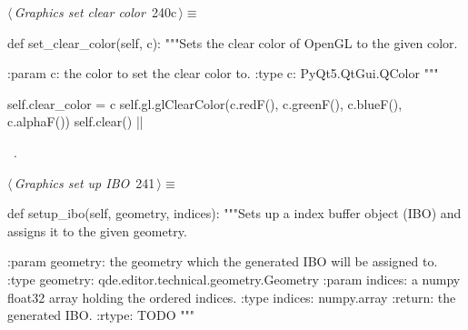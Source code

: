 \documentclass[%
    a4paper,    %
    justified,  %
    nobib,      %
    openany     %
]{tufte-book}
\makeatletter
\renewcommand{\label}[1]{\@tufte@label{##1}}%
\makeatother
\begin{document}
\begin{fullwidth}
\begin{flushleft}
\begin{minipage}{\linewidth}
\begin{list}{}{\setlength{\itemsep}{-\parsep}\setlength{\itemindent}{-\leftmargin}}
\item{}
\end{list}
\end{minipage}\vspace{4ex}
\end{flushleft}
\begin{flushleft} \small
\begin{minipage}{\linewidth}\label{scrap260}\raggedright\small
{} $\langle\,${\itshape Graphics set clear color}\nobreak\ {\footnotesize {240c}}$\,\rangle\equiv$
\vspace{-1ex}
\begin{pythoncode}
def set_clear_color(self, c):
    """Sets the clear color of OpenGL to the given color.

    :param c: the color to set the clear color to.
    :type  c: PyQt5.QtGui.QColor
    """

    self.clear_color = c
    self.gl.glClearColor(c.redF(), c.greenF(), c.blueF(), c.alphaF())
    self.clear()
|\NWsep|
\end{pythoncode}
\vspace{1.5ex}
\footnotesize
\begin{list}{}{\setlength{\itemsep}{-\parsep}\setlength{\itemindent}{-\leftmargin}}
\item \NWtxtMacroRefIn\ .

\item{}
\end{list}
\end{minipage}\vspace{4ex}
\end{flushleft}
\begin{flushleft} \small
\begin{minipage}{\linewidth}\label{scrap261}\raggedright\small
{} $\langle\,${\itshape Graphics set up IBO}\nobreak\ {\footnotesize {241}}$\,\rangle\equiv$
\vspace{-1ex}
\begin{pythoncode}
def setup_ibo(self, geometry, indices):
    """Sets up a index buffer object (IBO) and assigns it to the given
    geometry.

    :param geometry: the geometry which the generated IBO will be assigned
                     to.
    :type geometry:  qde.editor.technical.geometry.Geometry
    :param indices:  a numpy float32 array holding the ordered indices.
    :type indices:   numpy.array
    :return:         the generated IBO.
    :rtype:          TODO
    """


\end{pythoncode}
\end{minipage}
\end{flushleft}
\end{fullwidth}
\end{document}
